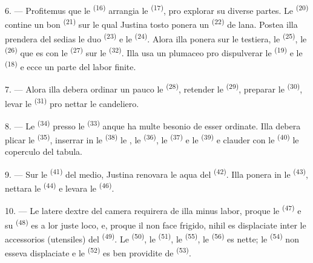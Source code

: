 6. --- Profitemus que le  \textsuperscript{(16)} arrangia le
 \textsuperscript{(17)}, pro explorar su diverse partes. Le
 \textsuperscript{(20)} contine un bon  \textsuperscript{(21)} sur le qual Justina tosto ponera un
 \textsuperscript{(22)} de lana. Postea illa prendera del sedias
le duo  \textsuperscript{(23)} e le 
\textsuperscript{(24)}. Alora illa ponera sur le testiera, le  \textsuperscript{(25)}, le 
\textsuperscript{(26)} que es con le  \textsuperscript{(27)} sur
le  \textsuperscript{(32)}. Illa usa un plumaceo pro
dispulverar le  \textsuperscript{(19)} e le  \textsuperscript{(18)} e ecce un parte del labor finite.

7. --- Alora illa debera ordinar un pauco le 
\textsuperscript{(28)}, retender le  \textsuperscript{(29)},
preparar le  \textsuperscript{(30)}, levar le
 \textsuperscript{(31)} pro nettar le candeliero.

\VUsaut{5.0mm}
\VUsaut{3.0mm}

8. --- Le  \textsuperscript{(34)} presso le
 \textsuperscript{(33)} anque ha multe besonio de esser
ordinate. Illa debera plicar le  \textsuperscript{(35)},
inserrar in le  \textsuperscript{(38)} le
, le  \textsuperscript{(36)}, le 
\textsuperscript{(37)} e le  \textsuperscript{(39)} e clauder
con le  \textsuperscript{(40)} le coperculo del tabula.

9. --- Sur le  \textsuperscript{(41)} del medio, Justina
renovara le aqua del  \textsuperscript{(42)}. Illa ponera
 in le  \textsuperscript{(43)}, nettara le
 \textsuperscript{(44)} e levara le  \textsuperscript{(46)}.

10. --- Le latere dextre del camera requirera de illa minus labor, proque le
 \textsuperscript{(47)} e su 
\textsuperscript{(48)} es a lor juste loco, e, proque il non face frigido, nihil
es displaciate inter le accessorios (utensiles) del 
\textsuperscript{(49)}. Le  \textsuperscript{(50)}, le
 \textsuperscript{(51)}, le 
\textsuperscript{(55)}, le  \textsuperscript{(56)} es
nette; le  \textsuperscript{(54)} non esseva displaciate
e le  \textsuperscript{(52)} es ben providite de
 \textsuperscript{(53)}.

